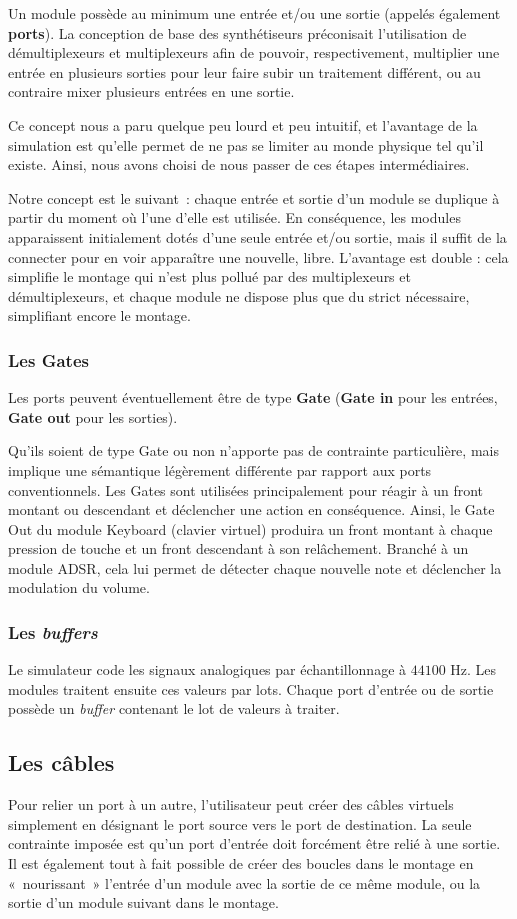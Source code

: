 Un module possède au minimum une entrée et/ou une sortie (appelés
également \textbf{ports}). La conception de base des synthétiseurs
préconisait l'utilisation de démultiplexeurs et multiplexeurs afin
de pouvoir, respectivement, multiplier une entrée en plusieurs
sorties pour leur faire subir un traitement différent, ou au
contraire mixer plusieurs entrées en une sortie.

Ce concept nous a paru quelque peu lourd et peu intuitif, et
l'avantage de la simulation est qu'elle permet de
ne pas se limiter au monde physique tel qu'il existe. Ainsi, nous
avons choisi de nous passer de ces étapes intermédiaires.

Notre concept est le suivant~: chaque entrée et sortie d'un module
se duplique à partir du moment où l'une d'elle est utilisée. En
conséquence, les modules apparaissent initialement dotés d'une
seule entrée et/ou sortie, mais il suffit de la connecter
pour en voir apparaître une nouvelle, libre. L'avantage est double
: cela simplifie le montage qui n'est plus pollué par des
multiplexeurs et démultiplexeurs, et chaque module ne dispose plus
que du strict nécessaire, simplifiant encore le montage.

\subsubsection{Les Gates}

Les ports peuvent éventuellement être de type \textbf{Gate} (\textbf{Gate
in} pour les entrées, \textbf{Gate out} pour les sorties).

Qu'ils soient de type Gate ou non n'apporte pas de contrainte
particulière, mais implique une sémantique légèrement différente
par rapport aux ports conventionnels. Les Gates sont utilisées
principalement pour réagir à un front montant ou descendant et
déclencher une action en conséquence. Ainsi, le Gate Out du module
Keyboard (clavier virtuel) produira un front montant à chaque
pression de touche et un front descendant à son relâchement.
Branché à un module ADSR, cela lui permet de détecter chaque
nouvelle note et déclencher la modulation du volume.

\subsubsection{Les \emph{buffers}}

Le simulateur code les signaux analogiques par échantillonnage à $44100$ Hz. Les modules
traitent ensuite ces valeurs par lots. Chaque port d'entrée ou de sortie possède un
\emph{buffer} contenant le lot de valeurs à traiter.

\subsection{Les câbles}

Pour relier un port à un autre, l'utilisateur peut créer des câbles
virtuels simplement en désignant le port source vers le port de
destination. La seule contrainte imposée est qu'un port d'entrée
doit forcément être relié à une sortie. Il est également tout à
fait possible de créer des boucles dans le montage en
«~nourissant~» l'entrée d'un module avec la sortie de ce même
module, ou la sortie d'un module suivant dans le montage.
